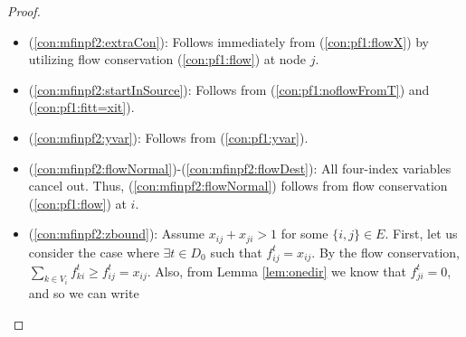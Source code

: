 \begin{proof}
\begin{itemize}
It follows from Lemma \ref{lem:onedir} that $f^t_{ki}=0$, and by utilizing (\ref{con:pf1:xfrel}) we get
$$f^t_{ik}=x_{ik}>\sum\limits_{j \in V_i\setminus\{k\}}x_{ji} \geq \sum\limits_{j \in V_i\setminus\{k\}}f^t_{ji}=\sum\limits_{j \in V_i}f^t_{ji},$$
which contradicts flow conservation constraints (\ref{con:pf1:flow}).

In case the option \ref{lem:item:slack}) from Lemma \ref{lem:xequals} holds, we know from Lemma \ref{lem:oneslack} that $x_{ki}=f^*_{ki}$, and so $\exists t\in D_0 \text{ s. t. }f^t_{ki}=x_{ki}$. Moreover, Lemma \ref{lem:onedir} says that if for some $s\in D_0: f^s_{ki}>0$, then $f^s_{ik} = 0$, i.e. any flow that enters $i$ via $(ki)$ must leave it through an arc different from $(ik)$. Together with from the flow conservation and (\ref{con:pf1:xfrel}),
$$
x_{ki}=f^t_{ki}\leq\sum_{j\in V_i}f^t_{ij}=\sum_{j\in V_i\setminus\{k\}}f^t_{ij}\leq\sum_{j\in V_i\setminus\{k\}}x_{ij}.
$$
Combined with the assumption \ref{eq:assumContr} we obtain
$$
\sum_{j\in V_i}x_{ji} = x_{ki} + \sum_{j\in V_i\setminus\{k\}}x_{ji}<x_{ik} + \sum_{j\in V_i\setminus\{k\}}x_{ij} = \sum_{j\in V_i}x_{ij},
$$
which is in contradiction with \ref{lem:item:slack}) of Lemma \ref{lem:xequals}, that asserts that (\ref{con:pf1:flowX}) is satisfied with equality. We have shown that every possibility that assumes that the negation of (\ref{con:mfinpf2:arrowFromNonDestA}) holds leads to a contradiction, and so the proof of (\ref{con:mfinpf2:arrowFromNonDestA}) is finalized.
\item[] (\ref{con:mfinpf2:extraCon}): Follows immediately from (\ref{con:pf1:flowX}) by utilizing flow conservation (\ref{con:pf1:flow}) at node $j$.
\item[] (\ref{con:mfinpf2:startInSource}): Follows from (\ref{con:pf1:noflowFromT}) and (\ref{con:pf1:fitt=xit}).
\item[] (\ref{con:mfinpf2:yvar}): Follows from (\ref{con:pf1:yvar}).
\item[] (\ref{con:mfinpf2:flowNormal})-(\ref{con:mfinpf2:flowDest}): All four-index variables cancel out. Thus, (\ref{con:mfinpf2:flowNormal}) follows from flow conservation (\ref{con:pf1:flow}) at $i$.
\item[] (\ref{con:mfinpf2:zbound}): Assume $x_{ij}+x_{ji}>1$ for some $\{i,j\}\in E$. First, let us consider the case where $\exists t\in D_0$ such that $f^t_{ij}=x_{ij}$. By the flow conservation, $\sum_{k\in V_{i}}f^t_{ki}\geq f^t_{ij}=x_{ij}.$ Also, from Lemma \ref{lem:onedir} we know that $f^t_{ji}=0$, and so we can write 

\end{itemize}
\end{proof}
